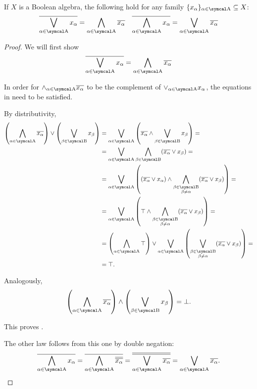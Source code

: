 \begin{theorem}\label{thm:de_morgans_laws}
  If \( X \) is a Boolean algebra, the following hold for any family \( \{ x_\al \}_{\al \in \CA} \subseteq X \):
  \begin{align*}
    \Ol{\bigvee_{\al \in \CA} x_\al} = \bigwedge_{\al \in \CA} \Ol{x_\al}
    &&
    \Ol{\bigwedge_{\al \in \CA} x_\al} = \bigvee_{\al \in \CA} \Ol{x_\al}
  \end{align*}
\end{theorem}
\begin{proof}
  We will first show
  \begin{equation}\label{thm:de_morgans_laws/equation}
    \Ol{\bigvee_{\al \in \CA} x_\al} = \bigwedge_{\al \in \CA} \Ol{x_\al}
  \end{equation}

  In order for \( \wedge_{\al \in \CA} \Ol{x_\al} \) to be the complement of \( \vee_{\al \in \CA} x_\al \), the equations in  need to be satisfied.

  By distributivity,
  \begin{align*}
    \left( \bigwedge_{\al \in \CA} \Ol{x_\al} \right) \vee \left( \bigvee_{\beta \in \CB} x_\beta \right)
    &=
    \bigvee_{\al \in \CA} \left( \Ol{x_\al} \wedge \bigvee_{\beta \in \CB} x_\beta \right)
    = \\ &=
    \bigvee_{\al \in \CA} \bigwedge_{\beta \in \CB} (\Ol{x_\al} \vee x_\beta)
    = \\ &=
    \bigvee_{\al \in \CA} \left( (\Ol{x_\al} \vee x_\al) \wedge \bigwedge_{\substack{\beta \in \CB \\ \beta \neq \al}} (\Ol{x_\al} \vee x_\beta) \right)
    = \\ &=
    \bigvee_{\al \in \CA} \left( \top \wedge \bigwedge_{\substack{\beta \in \CB \\ \beta \neq \al}} (\Ol{x_\al} \vee x_\beta) \right)
    = \\ &=
    \left( \bigwedge_{\al \in \CA} \top \right) \vee \bigvee_{\al \in \CA} \left( \bigvee_{\substack{\beta \in \CB \\ \beta \neq \al}} (\Ol{x_\al} \vee x_\beta) \right)
    = \\ &=
    \top.
  \end{align*}

  Analogously,
  \begin{equation*}
    \left( \bigwedge_{\al \in \CA} \Ol{x_\al} \right) \wedge \left( \bigvee_{\beta \in \CB} x_\beta \right) = \bot.
  \end{equation*}

  This proves .

  The other law follows from this one by double negation:
  \begin{equation*}
    \Ol{\bigwedge_{\al \in \CA} x_\al}
    =
    \Ol{\bigwedge_{\al \in \CA} \Ol{\Ol{x_\al}}}
    =
    \Ol{\Ol{\bigvee_{\al \in \CA} \Ol{x_\al}}}
    =
    \bigvee_{\al \in \CA} \Ol{x_\al}.
  \end{equation*}
\end{proof}

